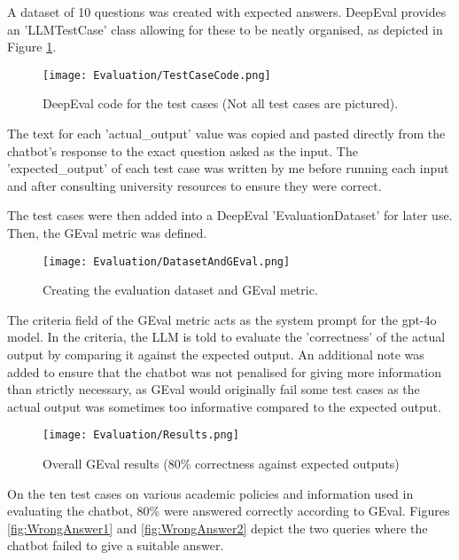 \para A dataset of 10 questions was created with expected answers. DeepEval provides an 'LLMTestCase' class allowing for these to be neatly 
organised, as depicted in Figure \ref{fig:TestCaseCode}.

\begin{figure}[H]
    \centering
    \texttt{[image: Evaluation/TestCaseCode.png]}
    \caption{DeepEval code for the test cases (Not all test cases are pictured). \label{fig:TestCaseCode}}
\end{figure}

\noindent The text for each 'actual\_output' value was copied and pasted directly from the chatbot's response to the exact question asked 
as the input. The 'expected\_output' of each test case was written by me before running each input and after consulting university resources 
to ensure they were correct.

\para The test cases were then added into a DeepEval 'EvaluationDataset' for later use. Then, the GEval metric was defined.

\begin{figure}[H]
    \centering
    \texttt{[image: Evaluation/DatasetAndGEval.png]}
    \caption{Creating the evaluation dataset and GEval metric. \label{fig:GEvalAndDataset}}
\end{figure}

\noindent The criteria field of the GEval metric acts as the system prompt for the gpt-4o model. In the criteria, the LLM is told 
to evaluate the 'correctness' of the actual output by comparing it against the expected output. An additional note was added to ensure 
that the chatbot was not penalised for giving more information than strictly necessary, as GEval would originally fail some test cases 
as the actual output was sometimes too informative compared to the expected output.

\begin{figure}[H]
    \centering
    \texttt{[image: Evaluation/Results.png]}
    \caption{Overall GEval results (80\% correctness against expected outputs) \label{fig:EvalResults}}
\end{figure}

\noindent On the ten test cases on various academic policies and information used in evaluating the chatbot,
80\% were answered correctly according to GEval. Figures \ref{fig:WrongAnswer1} and \ref{fig:WrongAnswer2} depict 
the two queries where the chatbot failed to give a suitable answer.

